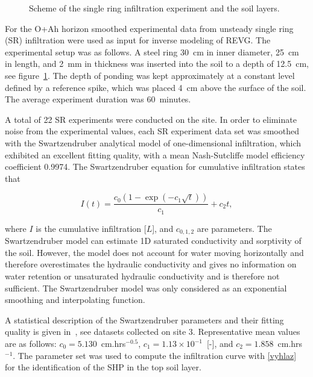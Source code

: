 \documentclass[review,times,3p,twocolumn,10pt]{elsarticle}
\newenvironment{lineq}
    {\begin{linenomath*}
    \begin{equation}
    }
    { 
    \end{equation} 
    \end{linenomath*}
    }
\begin{document}
 \begin{figure}
\centering
{}
 \caption{Scheme of the single ring infiltration experiment and the soil layers. }
 \label{experiment}
\end{figure}


For the O+Ah horizon smoothed experimental data from unsteady single ring (SR) infiltration were used as input for inverse modeling of REVG.
The experimental setup was as follows. A steel ring 30~cm in inner diameter, 25~cm in length, and 2~mm in thickness was inserted into the soil to a depth of 12.5~cm, see figure~\ref{experiment}. The depth of ponding was kept approximately at a constant level defined by a reference spike, which was placed 4~cm above the surface of the soil. The average experiment duration was 60~minutes.





A total of 22 SR experiments were conducted on the site. In order to eliminate noise from the experimental values, each SR experiment data set was smoothed with the Swartzendruber analytical model \citep{Swartzendruber}
of one-dimensional infiltration, which exhibited an excellent fitting quality, with a mean Nash-Sutcliffe model efficiency coefficient  0.9974. The Swartzendruber equation for cumulative infiltration states that
\begin{lineq}
I(t)=\frac{c_0\left(1-\exp\left(-c_1\sqrt{t}\right)\right)}{c_1}+c_2t,
\label{vyhlaz}
\end{lineq}
where $I$ is the cumulative infiltration [$L$], and $c_{0,1,2}$ are parameters. The Swartzendruber model can estimate 1D saturated conductivity and sorptivity of the soil. However, the model does not account for water moving horizontally and therefore overestimates the hydraulic conductivity and gives no information on water retention or unsaturated hydraulic conductivity and is therefore not sufficient. The Swartzendruber model was only considered as an exponential smoothing and interpolating function.


 
A statistical description of the Swartzendruber parameters and their fitting quality is given in~\citep{jacka-site}, see datasets collected on site 3. Representative mean values are as follows: $c_0 =5.130$~cm.hrs$^{-0.5}$, $c_1 = 1.13 \times 10^{-1}$~[-], and $c_2 = 1.858$~cm.hrs$^{-1}$. The parameter set was used to compute the infiltration curve with \eqref{vyhlaz} for the identification of the SHP in the top soil layer.
\end{document}
